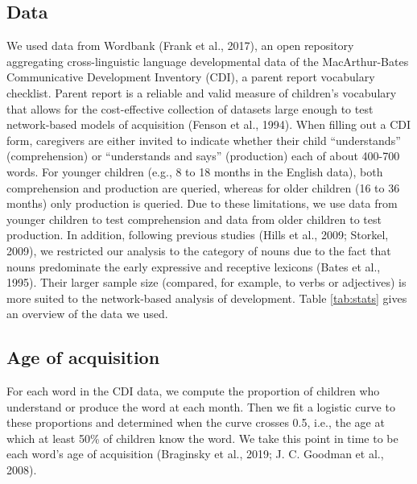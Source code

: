 \documentclass[english,floatsintext,man]{apa6}
\theoremstyle{definition}
\theoremstyle{definition}
\theoremstyle{definition}
\theoremstyle{remark}
\begin{document}
\subsection{Data}\label{data}

We used data from Wordbank (Frank et al., 2017), an open repository
aggregating cross-linguistic language developmental data of the
MacArthur-Bates Communicative Development Inventory (CDI), a parent
report vocabulary checklist. Parent report is a reliable and valid
measure of children's vocabulary that allows for the cost-effective
collection of datasets large enough to test network-based models of
acquisition (Fenson et al., 1994). When filling out a CDI form,
caregivers are either invited to indicate whether their child
\enquote{understands} (comprehension) or \enquote{understands and says}
(production) each of about 400-700 words. For younger children (e.g., 8
to 18 months in the English data), both comprehension and production are
queried, whereas for older children (16 to 36 months) only production is
queried. Due to these limitations, we use data from younger children to
test comprehension and data from older children to test production. In
addition, following previous studies (Hills et al., 2009; Storkel,
2009), we restricted our analysis to the category of nouns due to the
fact that nouns predominate the early expressive and receptive lexicons
(Bates et al., 1995). Their larger sample size (compared, for example,
to verbs or adjectives) is more suited to the network-based analysis of
development. Table \ref{tab:stats} gives an overview of the data we
used.

\subsection{Age of acquisition}\label{age-of-acquisition}

For each word in the CDI data, we compute the proportion of children who
understand or produce the word at each month. Then we fit a logistic
curve to these proportions and determined when the curve crosses 0.5,
i.e., the age at which at least 50\% of children know the word. We take
this point in time to be each word's age of acquisition (Braginsky et
al., 2019; J. C. Goodman et al., 2008).
\end{document}
